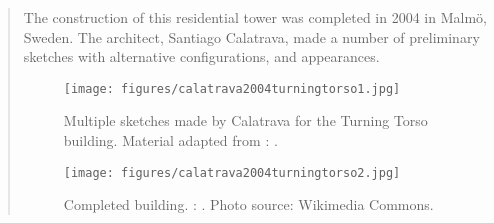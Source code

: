		
\clearpage
{}
		\begin{quote}
		\small
		The construction of this residential tower was completed in 2004 in Malm\"{o}, Sweden.
		The architect, Santiago Calatrava, made a number of preliminary sketches
		with alternative configurations, and appearances.
		\begin{figure}[htb]
		\begin{center}
		\texttt{[image: figures/calatrava2004turningtorso1.jpg]}
		\caption{
		Multiple sketches made by Calatrava for the Turning Torso building.		
		Material adapted from 
		\citeauthor{jodidio2009calatrava}: 
		\cite{jodidio2009calatrava}.}		
		\label{fig:calatrava2004turningtorso1}
		\end{center}
		\end{figure}
		
		\begin{figure}[htb]
		\begin{center}
		\texttt{[image: figures/calatrava2004turningtorso2.jpg]}
		\caption{
		Completed building.
		\citeauthor{calatrava2004turningtorso}: 
		\cite{calatrava2004turningtorso}.
		Photo source: Wikimedia Commons. 
		}		
		\label{fig:calatrava2004turningtorso2}
		\end{center}
		\end{figure}		

		\end{quote}
				
